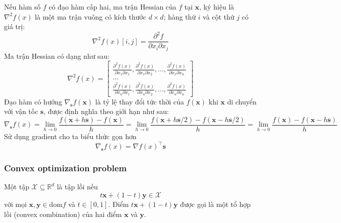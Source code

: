 Nếu hàm số $f$ có đạo hàm cấp hai, ma trận Hessian của $f$ tại $\mathbf{x}$, ký hiệu là $\nabla^2 f(x)$ là một ma trận vuông có kích thước $d \times d$; hàng thứ $i$ và cột thứ $j$ có giá trị:
\begin{equation}
    \nabla^2 f(x)[i, j] = \frac{\partial^2f}{\partial x_i \partial x_j}
\end{equation}
Ma trận Hessian có dạng như sau:
\begin{equation}
	\nabla^2 f(x) =
	    \begin{bmatrix}
		    \frac{\partial^2 f(x)}{\partial x_1 \partial x_1}, \frac{\partial^2 f(x)}{\partial x_1 \partial x_2}, ..., \frac{\partial^2 f(x)}{\partial x_1 \partial x_n}\\
					...\\
		    \frac{\partial^2 f(x)}{\partial x_n \partial x_1}, \frac{\partial^2 f(x)}{\partial x_n \partial x_2}, ..., \frac{\partial^2 f(x)}{\partial x_n \partial x_n}
		\end{bmatrix}
\end{equation}
Đạo hàm có hướng $\nabla_{\textbf{s}} f(\textbf{x})$ là tỷ lệ thay đổi tức thời của $f(\mathbf{x})$ khi $\mathbf{x}$ di chuyển với vận tốc $\mathbf{s}$, được định nghĩa theo giới hạn như sau:
\begin{equation}
	\nabla_{\textbf{s}} f(x) = \displaystyle \lim_{h \to 0}\frac{f(\textbf{x}+h\textbf{s})-f(\textbf{x})}{h} = \displaystyle \lim_{h \to 0}\frac{f(\textbf{x}+h\textbf{s}/2)-f(\textbf{x}-h\textbf{s}/2)}{h}=\displaystyle \lim_{h \to 0}\frac{f(\textbf{x})-f(\textbf{x}-h\textbf{s})}{h}
\end{equation}
Sử dụng gradient cho ta biểu thức gọn hơn
\begin{equation}
	\nabla_{\textbf{s}} f(x) = \nabla f(x)^{\top}\textbf{s}
\end{equation}

\subsubsection{Convex optimization problem}

Một tập $\mathcal{X} \subseteq \mathbb{R}^d$ là tập lồi nếu
\begin{equation}
    t\mathbf{x} + (1-t)\mathbf{y} \in \mathcal{X}
\end{equation}
với mọi $\mathbf{x}, \mathbf{y} \in \text{dom}f$ và $t \in [0, 1]$. Điểm $t\mathbf{x} + (1-t)\mathbf{y}$ được gọi là một tổ hợp lồi (convex combination) của hai điểm $\mathbf{x}$ và $\mathbf{y}$.

